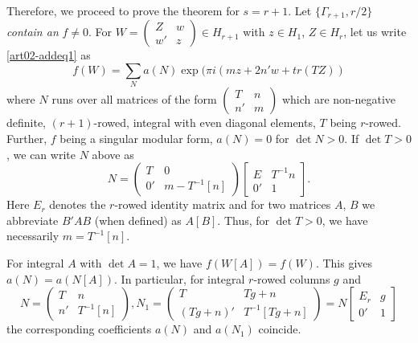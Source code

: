 Therefore, we proceed to prove the theorem for $s=r+1$. Let
$\{\Gamma_{r+1},r/2\}$ {\em contain an} $f\neq 0$. For
$W=\left(\begin{smallmatrix} Z & w\\ w' & z\end{smallmatrix}\right)\in
H_{r+1}$ with $z\in H_{1}$, $Z\in H_{r}$, let us write \eqref{art02-addeq1}
as 
\setcounter{equation}{0}
\begin{equation}
f(W)=\sum_{N}a(N)\exp (\pi i(mz+2n'w+tr(TZ))\label{art02-eq2}
\end{equation}
where $N$ runs over all matrices of the form
$\left(\begin{smallmatrix} T &n\\ n' & m\end{smallmatrix}\right)$
which are non-negative definite, $(r+1)$-rowed, integral with even
diagonal elements, $T$ being $r$-rowed. Further, $f$ being a singular
modular form, $a(N)=0$ for $\det N>0$. If $\det T>0$, we can write $N$
above as 
$$
N=
\begin{pmatrix}
T & 0\\
0' & m-T^{-1}[n]
\end{pmatrix}
\begin{bmatrix}
E & T^{-1}n\\
0' & 1
\end{bmatrix}.
$$
Here $E_{r}$ denotes the $r$-rowed identity matrix and for two
matrices $A$, $B$ we abbreviate $B'AB$ (when defined) as $A[B]$. Thus,
for $\det T>0$, we have necessarily $m=T^{-1}[n]$.

For integral $A$ with $\det A=1$, we have $f(W[A])=f(W)$. This gives
$a(N)=a(N[A])$. In particular, for integral $r$-rowed columns $g$ and 
$$
N=
\begin{pmatrix}
T & n\\
n' & T^{-1}[n]
\end{pmatrix},
N_{1}=
\begin{pmatrix}
T & Tg+n\\
(Tg+n)' & T^{-1}[Tg+n]
\end{pmatrix}
=N
\begin{bmatrix}
E_{r} & g\\
0' & 1
\end{bmatrix}
$$ 
the corresponding coefficients $a(N)$ and $a(N_{1})$ coincide.

